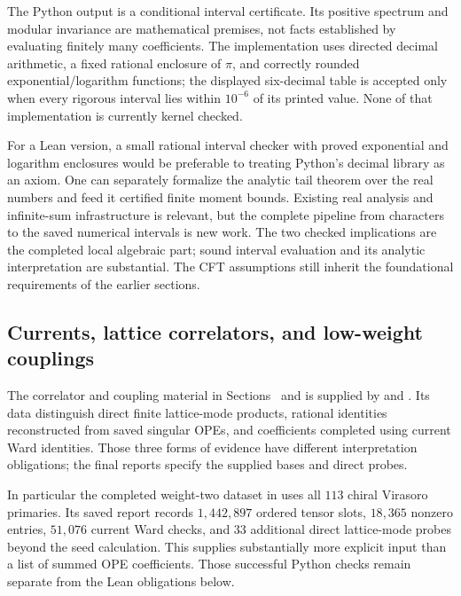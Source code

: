 The Python output is a conditional interval certificate. Its positive
spectrum and modular invariance are mathematical premises, not facts
established by evaluating finitely many coefficients. The implementation
uses directed decimal arithmetic, a fixed rational enclosure of $\pi$,
and correctly rounded exponential/logarithm functions; the displayed
six-decimal table is accepted only when every rigorous interval lies
within $10^{-6}$ of its printed value. None of that implementation is
currently kernel checked.

For a Lean version, a small rational interval checker with proved
exponential and logarithm enclosures would be preferable to treating
Python's decimal library as an axiom. One can separately formalize the
analytic tail theorem over the real numbers and feed it certified
finite moment bounds. Existing real analysis and infinite-sum
infrastructure is relevant, but the complete pipeline from characters
to the saved numerical intervals is new work. The two checked
implications are the completed local algebraic part; sound interval
evaluation and its analytic interpretation
are substantial. The CFT assumptions still inherit the foundational
requirements of the earlier sections.

\subsection{Currents, lattice correlators, and low-weight couplings}

The correlator and coupling material in
Sections~ and
 is supplied by
 and
. Its data distinguish
direct finite lattice-mode products, rational identities reconstructed
from saved singular OPEs, and coefficients completed using current
Ward identities. Those three forms of evidence have different
interpretation obligations; the final reports specify the supplied
bases and direct probes.

In particular the completed weight-two dataset in
 uses all $113$ chiral
Virasoro primaries. Its saved report records $1{,}442{,}897$ ordered
tensor slots, $18{,}365$ nonzero entries, $51{,}076$ current Ward
checks, and $33$ additional direct lattice-mode probes beyond the
seed calculation. This supplies substantially more explicit input
than a list of summed OPE coefficients. Those successful Python
checks remain separate from the Lean obligations below.

